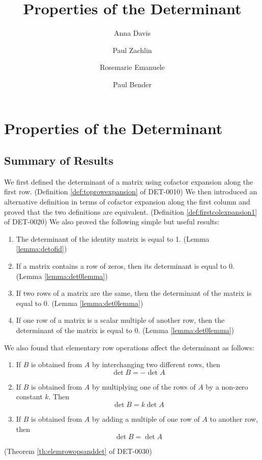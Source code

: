 \documentclass{ximera}
\author{Anna Davis \and Paul Zachlin \and Rosemarie Emanuele \and Paul Bender} \title{Properties of the Determinant} \license{CC-BY 4.0}
\begin{document}
\begin{abstract}
\end{abstract}
\maketitle

\section*{Properties of the Determinant}
\subsection*{Summary of Results}
We first defined the determinant of a matrix using cofactor expansion along the first row. (Definition \ref{def:toprowexpansion} of DET-0010)  We then introduced an alternative definition in terms of cofactor expansion along the first column and proved that the two definitions are equivalent. (Definition \ref{def:firstcolexpansion1} of DET-0020)  We also proved the following simple but useful results:
\begin{enumerate}
\item The determinant of the identity matrix is equal to 1. (Lemma \ref{lemma:detofid})

\item If a matrix contains a row of zeros, then its determinant is equal to 0. (Lemma \ref{lemma:det0lemma})
\item If two rows of a matrix are the same, then the determinant of the matrix is equal to 0.  (Lemma \ref{lemma:det0lemma})
\item If one row of a matrix is a scalar multiple of another row, then the determinant of the matrix is equal to 0. (Lemma \ref{lemma:det0lemma})
\end{enumerate}
We also found that elementary row operations affect the determinant as follows:
\begin{enumerate}
\item
If $B$ is obtained from $A$ by interchanging two different rows, then $$\det{B}=-\det{A}$$
\item 
If $B$ is obtained from $A$ by multiplying one of the rows of $A$ by a non-zero constant $k$.  Then $$\det{B}=k\det{A}$$
\item 
If $B$ is obtained from $A$ by adding a multiple of one row of $A$ to another row, then
$$\det{B}=\det{A}$$
\end{enumerate}
(Theorem \ref{th:elemrowopsanddet} of DET-0030)
\end{document}
